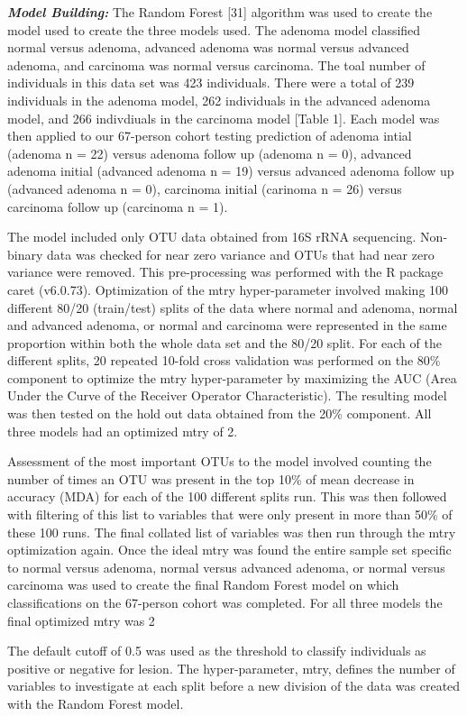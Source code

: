\documentclass[12pt,]{article}
\begin{document}
\textbf{\emph{Model Building:}} The Random Forest {[}31{]} algorithm was
used to create the model used to create the three models used. The
adenoma model classified normal versus adenoma, advanced adenoma was
normal versus advanced adenoma, and carcinoma was normal versus
carcinoma. The toal number of individuals in this data set was 423
individuals. There were a total of 239 individuals in the adenoma model,
262 individuals in the advanced adenoma model, and 266 indivdiuals in
the carcinoma model {[}Table 1{]}. Each model was then applied to our
67-person cohort testing prediction of adenoma intial (adenoma n = 22)
versus adenoma follow up (adenoma n = 0), advanced adenoma initial
(advanced adenoma n = 19) versus advanced adenoma follow up (advanced
adenoma n = 0), carcinoma initial (carinoma n = 26) versus carcinoma
follow up (carcinoma n = 1).

The model included only OTU data obtained from 16S rRNA sequencing.
Non-binary data was checked for near zero variance and OTUs that had
near zero variance were removed. This pre-processing was performed with
the R package caret (v6.0.73). Optimization of the mtry hyper-parameter
involved making 100 different 80/20 (train/test) splits of the data
where normal and adenoma, normal and advanced adenoma, or normal and
carcinoma were represented in the same proportion within both the whole
data set and the 80/20 split. For each of the different splits, 20
repeated 10-fold cross validation was performed on the 80\% component to
optimize the mtry hyper-parameter by maximizing the AUC (Area Under the
Curve of the Receiver Operator Characteristic). The resulting model was
then tested on the hold out data obtained from the 20\% component. All
three models had an optimized mtry of 2.

Assessment of the most important OTUs to the model involved counting the
number of times an OTU was present in the top 10\% of mean decrease in
accuracy (MDA) for each of the 100 different splits run. This was then
followed with filtering of this list to variables that were only present
in more than 50\% of these 100 runs. The final collated list of
variables was then run through the mtry optimization again. Once the
ideal mtry was found the entire sample set specific to normal versus
adenoma, normal versus advanced adenoma, or normal versus carcinoma was
used to create the final Random Forest model on which classifications on
the 67-person cohort was completed. For all three models the final
optimized mtry was 2

The default cutoff of 0.5 was used as the threshold to classify
individuals as positive or negative for lesion. The hyper-parameter,
mtry, defines the number of variables to investigate at each split
before a new division of the data was created with the Random Forest
model.
\end{document}
